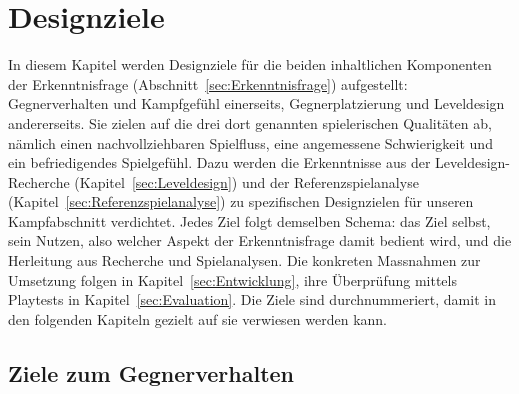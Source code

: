 \documentclass[../Main.tex]{subfiles}
\begin{document}
\section{Designziele} \label{sec:Designziele}

In diesem Kapitel werden Designziele für die beiden inhaltlichen Komponenten der Erkenntnisfrage (Abschnitt~\ref{sec:Erkenntnisfrage}) aufgestellt: Gegnerverhalten und Kampfgefühl einerseits, Gegnerplatzierung und Leveldesign andererseits. Sie zielen auf die drei dort genannten spielerischen Qualitäten ab, nämlich einen nachvollziehbaren Spielfluss, eine angemessene Schwierigkeit und ein befriedigendes Spielgefühl. Dazu werden die Erkenntnisse aus der Leveldesign-Recherche (Kapitel~\ref{sec:Leveldesign}) und der Referenzspielanalyse (Kapitel~\ref{sec:Referenzspielanalyse}) zu spezifischen Designzielen für unseren Kampfabschnitt verdichtet. Jedes Ziel folgt demselben Schema: das Ziel selbst, sein Nutzen, also welcher Aspekt der Erkenntnisfrage damit bedient wird, und die Herleitung aus Recherche und Spielanalysen. Die konkreten Massnahmen zur Umsetzung folgen in Kapitel~\ref{sec:Entwicklung}, ihre Überprüfung mittels Playtests in Kapitel~\ref{sec:Evaluation}. Die Ziele sind durchnummeriert, damit in den folgenden Kapiteln gezielt auf sie verwiesen werden kann.

\subsection{Ziele zum Gegnerverhalten}
\end{document}
